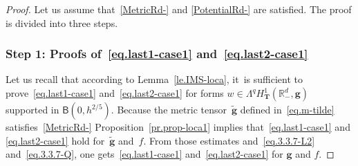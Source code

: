\documentclass[10pt]{amsart}
\newcommand{\mbf}[1]{\mathbf{#1}}
\theoremstyle{plain}
\theoremstyle{definition}
\begin{document}
\begin{proof}
Let us assume that~\ref{MetricRd-} and \ref{PotentialRd-} are satisfied.
The proof is divided into three steps.

\subsubsection*{Step 1: Proofs of~\eqref{eq.last1-case1} and~\eqref{eq.last2-case1}}
Let us recall that according to Lemma~\ref{le.IMS-loca}, it~is sufficient to prove~\eqref{eq.last1-case1} and~\eqref{eq.last2-case1} for forms $w\in \Lambda^q H^1_{\mbf T}(\mathbb R^d_-, \mbf{g})$ supported in $\mathsf B(0,h^{2/5 })$.
Because the metric tensor~$\tilde{\mbf g}$ defined
in~\eqref{eq.m-tilde} satisfies~\ref{MetricRd-}
Proposition~\ref{pr.prop-loca1} implies that~\eqref{eq.last1-case1}
and \eqref{eq.last2-case1} hold
for~$\tilde{\mbf g}$ and~$f$. From those estimates
and~\eqref{eq.3.3.7-L2} and~\eqref{eq.3.3.7-Q}, one gets~\eqref{eq.last1-case1} and~\eqref{eq.last2-case1} for
${\mbf g}$ and $f$.


\end{proof}
\end{document}
